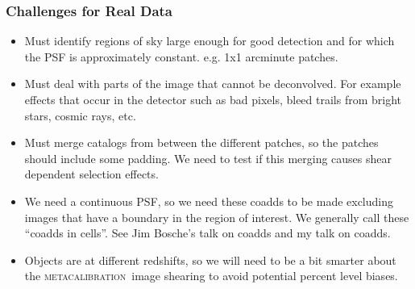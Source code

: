 \documentclass{beamer}
\newcommand{\mcal}{\textsc{metacalibration}}
\begin{document}
\frame
{
    \frametitle{Challenges for Real Data}

 
    \begin{itemize}


        \item Must identify regions of sky large enough for
            good detection and for which the PSF is approximately constant.
            e.g. 1x1 arcminute patches.

        \item Must deal with parts of the image that cannot be deconvolved. For
            example effects that occur in the detector such as bad pixels, bleed trails
            from bright stars, cosmic rays, etc.

        \item Must merge catalogs from between the different patches, so
            the patches should include some padding.  We need to test if this
            merging causes shear dependent selection effects.

        \item We need a continuous PSF, so we need these coadds to be made
            excluding images that have a boundary in the region of interest.
            We generally call these ``coadds in cells''.
            See Jim  Bosche's talk on coadds and my talk on coadds.

        \item Objects are at different redshifts, so we will need to be a bit
            smarter about the \mcal\ image shearing to avoid potential
            percent level biases.

    \end{itemize}

}



 


\end{document}
